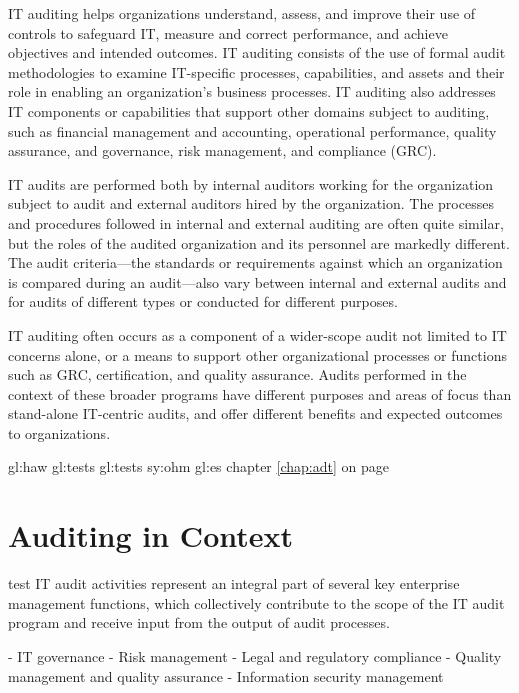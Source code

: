 IT auditing helps organizations understand, assess, and improve
their use of controls to safeguard IT, measure and correct performance, and achieve
objectives and intended outcomes. IT auditing consists of the use of formal audit
methodologies to examine IT-specific processes, capabilities, and assets and their
role in enabling an organization’s business processes. IT auditing also addresses IT
components or capabilities that support other domains subject to auditing, such as
financial management and accounting, operational performance, quality assurance,
and governance, risk management, and compliance (GRC).



IT audits are performed both by internal auditors working for the organization
subject to audit and external auditors hired by the organization. The processes and
procedures followed in internal and external auditing are often quite similar, but the
roles of the audited organization and its personnel are markedly different. The audit
criteria—the standards or requirements against which an organization is compared
during an audit—also vary between internal and external audits and for audits of
different types or conducted for different purposes.


IT auditing often occurs as a component of a wider-scope audit not limited to IT concerns alone, or a means to support
other organizational processes or functions such as GRC, certification, and quality
assurance. Audits performed in the context of these broader programs have different
purposes and areas of focus than stand-alone IT-centric audits, and offer different
benefits and expected outcomes to organizations.

\gls{gl:haw}
\glspl{gl:test}
\Glspl{gl:test}
\gls{sy:ohm}
\gls{gl:es}
chapter \ref{chap:adt} on page \pageref{chap:adt} 

\section{Auditing in Context}

 {test}
IT audit activities represent an integral part of several key enterprise management
functions, which collectively contribute to the scope of the IT audit program and receive
input from the output of audit processes.

- IT governance
- Risk management
- Legal and regulatory compliance
- Quality management and quality assurance
- Information security management

